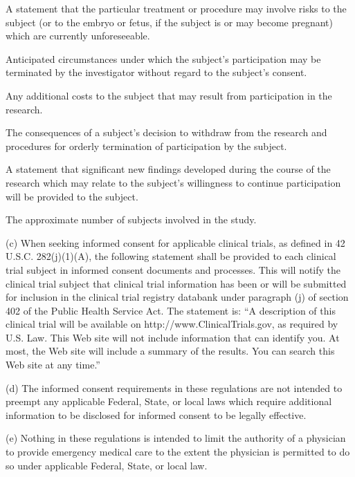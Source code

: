 \documentclass[11pt]{article}
\begin{document}
\begin{description}[leftmargin=1.0cm,style=sameline]
\item[(1)] A statement that the particular treatment or procedure may involve risks to the subject (or to the embryo or fetus, if the subject is or may become pregnant) which are currently unforeseeable.
\item[(2)] Anticipated circumstances under which the subject's participation may be terminated by the investigator without regard to the subject's consent.
\item[(3)] Any additional costs to the subject that may result from participation in the research.
\item[(4)] The consequences of a subject's decision to withdraw from the research and procedures for orderly termination of participation by the subject.
\item[(5)] A statement that significant new findings developed during the course of the research which may relate to the subject's willingness to continue participation will be provided to the subject.
\item[(6)] The approximate number of subjects involved in the study.
\end{description}

(c) When seeking informed consent for applicable clinical trials, as defined in 42 U.S.C. 282(j)(1)(A), the following statement shall be provided to each clinical trial subject in informed consent documents and processes. This will notify the clinical trial subject that clinical trial information has been or will be submitted for inclusion in the clinical trial registry databank under paragraph (j) of section 402 of the Public Health Service Act. The statement is: ``A description of this clinical trial will be available on http://www.ClinicalTrials.gov, as required by U.S. Law. This Web site will not include information that can identify you. At most, the Web site will include a summary of the results. You can search this Web site at any time.''

(d) The informed consent requirements in these regulations are not intended to preempt any applicable Federal, State, or local laws which require additional information to be disclosed for informed consent to be legally effective.

(e) Nothing in these regulations is intended to limit the authority of a physician to provide emergency medical care to the extent the physician is permitted to do so under applicable Federal, State, or local law.
\end{document}
